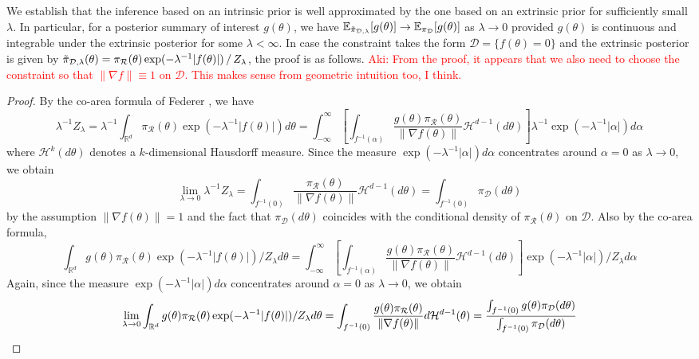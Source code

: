 \documentclass[10pt]{article}
\newcommand{\aki}[1]{\textcolor{red}{Aki: #1}}
\newcommand{\mc}[1]{\mathcal{#1}}
\DeclareMathOperator{\1}{\mathbbm{1}}
\begin{document}
We establish that the inference based on an intrinsic prior is well approximated by the one based on an extrinsic prior for sufficiently small $\lambda$. In particular, for a posterior summary of interest $g(\theta)$, we have $\mathbb{E}_{\tilpi_{\mc D, \lambda}}[g(\theta)] \to \mathbb{E}_{\pi_{\mc D}}[g(\theta)]$ as $\lambda \to 0$ provided $g(\theta)$ is continuous and integrable under the extrinsic posterior for some $\lambda < \infty$. In case the constraint takes the form $\mc D = \{f(\theta) = 0\}$ and the extrinsic posterior is given by $\tilpi_{\mc D, \lambda}(\theta) = \pi_{\mc R}(\theta) \exp(- \lambda^{-1} |f(\theta)|) \, / \, Z_\lambda$, the proof is as follows. \aki{From the proof, it appears that we also need to choose the constraint so that  $\| \nabla f \| \equiv 1$ on $\mc D$. This makes sense from geometric intuition too, I think.}
\begin{proof}[Proof]
	By the co-area formula of Federer \citep{diaconis2013manifold}, we have
	\begin{equation}
	\lambda^{-1} Z_\lambda
	= \lambda^{-1} \int_{\mathbb{R}^d} \pi_{\mc R}(\theta) \exp(- \lambda^{-1} |f(\theta)|)  d \theta
	= \int_{-\infty}^{\infty}  \left[ \int_{f^{-1}(\alpha)} \frac{ g(\theta) \pi_{\mc R}(\theta) }{ \| \nabla f(\theta) \| } \mathcal{H}^{d-1}(d \theta) \right]  \lambda^{-1} \exp(- \lambda^{-1} |\alpha| ) d \alpha
	\end{equation}
	where $\mathcal{H}^{k}(d \theta)$ denotes a $k$-dimensional Hausdorff measure. Since the measure $\exp(- \lambda^{-1} |\alpha| ) d \alpha$ concentrates around $\alpha = 0$ as $\lambda \to 0$, we obtain
	\begin{equation}
	\lim_{\lambda \to 0} \lambda^{-1} Z_\lambda
	= \int_{f^{-1}(0)} \frac{ \pi_{\mc R}(\theta) }{ \| \nabla f(\theta) \| } \mathcal{H}^{d-1}(d \theta) 
	= \int_{f^{-1}(0)} \pi_{\mc D}(d \theta)
	\end{equation}
	by the assumption $\| \nabla f(\theta) \|  = 1$ and the fact that $\pi_{\mc D}(d \theta)$ coincides with the conditional density of $\pi_{\mc R}(\theta)$ on $\mc D$. Also by the co-area formula,
	\begin{equation}
	\int_{\mathbb{R}^d} g(\theta) \pi_{\mc R}(\theta) \exp(- \lambda^{-1} |f(\theta)|)  /  Z_\lambda d \theta
	= \int_{-\infty}^{\infty}  \left[ \int_{f^{-1}(\alpha)} \frac{ g(\theta) \pi_{\mc R}(\theta) }{ \| \nabla f(\theta) \| } \mathcal{H}^{d-1}(d \theta) \right]  \exp(- \lambda^{-1} |\alpha| )  /  Z_\lambda d \alpha
	\end{equation}
	Again, since the measure $\exp(- \lambda^{-1} |\alpha| ) d \alpha$ concentrates around $\alpha = 0$ as $\lambda \to 0$, we obtain
	\begin{equation}
	\lim_{\lambda \to 0} \int_{\mathbb{R}^d} g(\theta) \pi_{\mc R}(\theta) \exp(- \lambda^{-1} |f(\theta)|)  /  Z_\lambda d \theta
	= \int_{f^{-1}(0)} \frac{ g(\theta) \pi_{\mc R}(\theta) }{ \| \nabla f(\theta) \| } d \mathcal{H}^{d-1}(\theta) 
	= \frac{\int_{f^{-1}(0)} g(\theta) \pi_{\mc D}(d \theta)}{\int_{f^{-1}(0)} \pi_{\mc D}(d \theta)} \qedhere
	\end{equation}
\end{proof}
\end{document}
